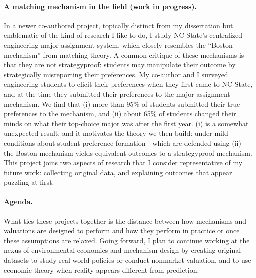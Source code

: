 \documentclass[12pt]{article}
\begin{document}
\paragraph{A matching mechanism in the field (work in progress).}

In a newer co-authored project, topically distinct from my dissertation but emblematic of the kind of research I like to do, I study NC State's centralized engineering major-assignment system, which closely resembles the ``Boston mechanism'' from matching theory. A common critique of these mechanisms is that they are not strategyproof: students may manipulate their outcome by strategically misreporting their preferences. My co-author and I surveyed engineering students to elicit their preferences when they first came to NC State, and at the time they submitted their preferences to the major-assignment mechanism. We find that (i) more than 95\% of students submitted their true preferences to the mechanism, and (ii) about 65\% of students changed their minds on what their top-choice major was after the first year. (i) is a somewhat unexpected result, and it motivates the theory we then build: under mild conditions about student preference formation---which are defended using (ii)---the Boston mechanism yields equivalent outcomes to a strategyproof mechanism. This project joins two aspects of research that I consider representative of my future work: collecting original data, and explaining outcomes that appear puzzling at first.

\paragraph{Agenda.}

What ties these projects together is the distance between how mechanisms and valuations are designed to perform and how they perform in practice or once these assumptions are relaxed. Going forward, I plan to continue working at the nexus of environmental economics and mechanism design by creating original datasets to study real-world policies or conduct nonmarket valuation, and to use economic theory when reality appears different from prediction.
\end{document}
